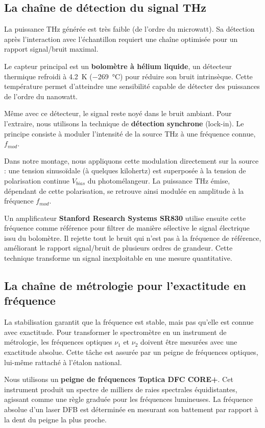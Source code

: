 \subsection{La chaîne de détection du signal THz}

La puissance THz générée est très faible (de l'ordre du microwatt). Sa détection après l'interaction avec l'échantillon requiert une chaîne optimisée pour un rapport signal/bruit maximal. 

Le capteur principal est un \textbf{bolomètre à hélium liquide}, un détecteur thermique refroidi à \SI{4,2}{\kelvin} (\SI{-269}{\celsius}) pour réduire son bruit intrinsèque. Cette température permet d'atteindre une sensibilité capable de détecter des puissances de l'ordre du nanowatt.

Même avec ce détecteur, le signal reste noyé dans le bruit ambiant. Pour l'extraire, nous utilisons la technique de \textbf{détection synchrone} (lock-in). Le principe consiste à moduler l'intensité de la source THz à une fréquence connue, $f_{mod}$. 

Dans notre montage, nous appliquons cette modulation directement sur la source : une tension sinusoïdale (à quelques kilohertz) est superposée à la tension de polarisation continue $V_{bias}$ du photomélangeur. La puissance THz émise, dépendant de cette polarisation, se retrouve ainsi modulée en amplitude à la fréquence $f_{mod}$.

Un amplificateur \textbf{Stanford Research Systems SR830} utilise ensuite cette fréquence comme référence pour filtrer de manière sélective le signal électrique issu du bolomètre. Il rejette tout le bruit qui n'est pas à la fréquence de référence, améliorant le rapport signal/bruit de plusieurs ordres de grandeur. Cette technique transforme un signal inexploitable en une mesure quantitative.

\subsection{La chaîne de métrologie pour l'exactitude en fréquence}

La stabilisation garantit que la fréquence est stable, mais pas qu'elle est connue avec exactitude. Pour transformer le spectromètre en un instrument de métrologie, les fréquences optiques $\nu_1$ et $\nu_2$ doivent être mesurées avec une exactitude absolue. Cette tâche est assurée par un peigne de fréquences optiques, lui-même rattaché à l'étalon national.

Nous utilisons un \textbf{peigne de fréquences Toptica DFC CORE+}. Cet instrument produit un spectre de milliers de raies spectrales équidistantes, agissant comme une règle graduée pour les fréquences lumineuses. La fréquence absolue d'un laser DFB est déterminée en mesurant son battement par rapport à la dent du peigne la plus proche.

